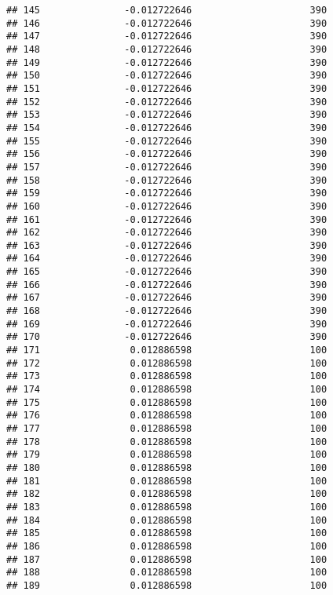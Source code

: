 \documentclass[]{article}
\begin{document}
\begin{verbatim}
## 145               -0.012722646                     390
## 146               -0.012722646                     390
## 147               -0.012722646                     390
## 148               -0.012722646                     390
## 149               -0.012722646                     390
## 150               -0.012722646                     390
## 151               -0.012722646                     390
## 152               -0.012722646                     390
## 153               -0.012722646                     390
## 154               -0.012722646                     390
## 155               -0.012722646                     390
## 156               -0.012722646                     390
## 157               -0.012722646                     390
## 158               -0.012722646                     390
## 159               -0.012722646                     390
## 160               -0.012722646                     390
## 161               -0.012722646                     390
## 162               -0.012722646                     390
## 163               -0.012722646                     390
## 164               -0.012722646                     390
## 165               -0.012722646                     390
## 166               -0.012722646                     390
## 167               -0.012722646                     390
## 168               -0.012722646                     390
## 169               -0.012722646                     390
## 170               -0.012722646                     390
## 171                0.012886598                     100
## 172                0.012886598                     100
## 173                0.012886598                     100
## 174                0.012886598                     100
## 175                0.012886598                     100
## 176                0.012886598                     100
## 177                0.012886598                     100
## 178                0.012886598                     100
## 179                0.012886598                     100
## 180                0.012886598                     100
## 181                0.012886598                     100
## 182                0.012886598                     100
## 183                0.012886598                     100
## 184                0.012886598                     100
## 185                0.012886598                     100
## 186                0.012886598                     100
## 187                0.012886598                     100
## 188                0.012886598                     100
## 189                0.012886598                     100

\end{verbatim}
\end{document}
